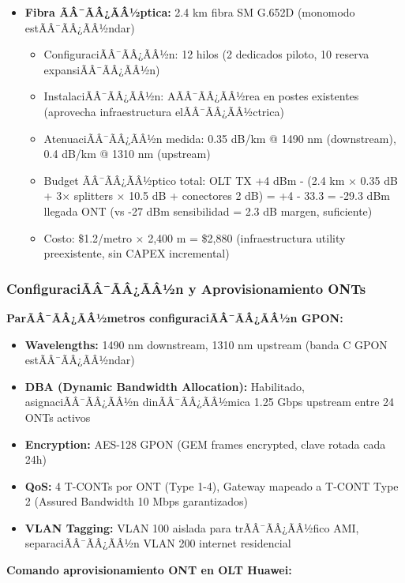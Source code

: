 \begin{itemize}
    \item \textbf{Fibra ÃÂ¯ÃÂ¿ÃÂ½ptica:} 2.4 km fibra SM G.652D (monomodo estÃÂ¯ÃÂ¿ÃÂ½ndar)
    \begin{itemize}
        \item ConfiguraciÃÂ¯ÃÂ¿ÃÂ½n: 12 hilos (2 dedicados piloto, 10 reserva expansiÃÂ¯ÃÂ¿ÃÂ½n)
        \item InstalaciÃÂ¯ÃÂ¿ÃÂ½n: AÃÂ¯ÃÂ¿ÃÂ½rea en postes existentes (aprovecha infraestructura elÃÂ¯ÃÂ¿ÃÂ½ctrica)
        \item AtenuaciÃÂ¯ÃÂ¿ÃÂ½n medida: 0.35 dB/km @ 1490 nm (downstream), 0.4 dB/km @ 1310 nm (upstream)
        \item Budget ÃÂ¯ÃÂ¿ÃÂ½ptico total: OLT TX +4 dBm - (2.4 km $\times$ 0.35 dB + 3$\times$ splitters $\times$ 10.5 dB + conectores 2 dB) = +4 - 33.3 = -29.3 dBm llegada ONT (vs -27 dBm sensibilidad = 2.3 dB margen, suficiente)
        \item Costo: \$1.2/metro $\times$ 2,400 m = \$2,880 (infraestructura utility preexistente, sin CAPEX incremental)
    \end{itemize}
\end{itemize}

\subsubsection{ConfiguraciÃÂ¯ÃÂ¿ÃÂ½n y Aprovisionamiento ONTs}

\textbf{ParÃÂ¯ÃÂ¿ÃÂ½metros configuraciÃÂ¯ÃÂ¿ÃÂ½n GPON:}

\begin{itemize}
    \item \textbf{Wavelengths:} 1490 nm downstream, 1310 nm upstream (banda C GPON estÃÂ¯ÃÂ¿ÃÂ½ndar)
    \item \textbf{DBA (Dynamic Bandwidth Allocation):} Habilitado, asignaciÃÂ¯ÃÂ¿ÃÂ½n dinÃÂ¯ÃÂ¿ÃÂ½mica 1.25 Gbps upstream entre 24 ONTs activos
    \item \textbf{Encryption:} AES-128 GPON (GEM frames encrypted, clave rotada cada 24h)
    \item \textbf{QoS:} 4 T-CONTs por ONT (Type 1-4), Gateway mapeado a T-CONT Type 2 (Assured Bandwidth 10 Mbps garantizados)
    \item \textbf{VLAN Tagging:} VLAN 100 aislada para trÃÂ¯ÃÂ¿ÃÂ½fico AMI, separaciÃÂ¯ÃÂ¿ÃÂ½n VLAN 200 internet residencial
\end{itemize}

\textbf{Comando aprovisionamiento ONT en OLT Huawei:}

